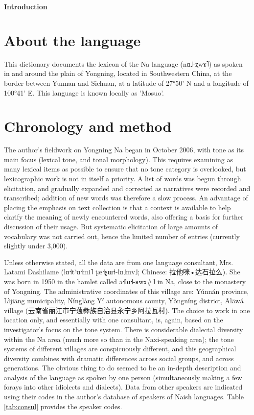 \documentclass[oldfontcommands,oneside,a4paper,11pt]{article}
\newcommand{\ipa}[1]{{\phon #1}} %
\newcommand{\zh}[1]{{\cn #1}}
\begin{document}
 
	
	{\LARGE \textbf{Introduction}}
	\section{About the language} \label{sec:language}
	
	This dictionary documents the lexicon of the Na language (\ipa{nɑ˩-ʐwɤ˥}) as spoken in and around the plain of Yongning, located in Southwestern China, at the border between Yunnan and Sichuan, at a latitude of 27°50’ N and a longitude of 100°41’ E. This language is known locally as 'Mosuo'. 
	
	\section{Chronology and method} \label{sec:method}
	
	The author's fieldwork on Yongning Na began in October 2006, with tone as its main focus (lexical tone, and tonal morphology). This requires examining as many lexical items as possible to ensure that no tone category is overlooked, but lexicographic work is not in itself a priority. A list of words was begun through elicitation, and gradually expanded and corrected as narratives were recorded and transcribed; addition of new words was therefore a slow process. An advantage of placing the emphasis on text collection is that a context is available to help clarify the meaning of newly encountered words, also offering a basis for further discussion of their usage. But systematic elicitation of large amounts of vocabulary was not carried out, hence the limited number of entries (currently slightly under 3,000). 
	
	Unless otherwise stated, all the data are from one language consultant, Mrs. Latami Dashilame (\ipa{lɑ˧tʰɑ˧mi˥ ʈæ˧ʂɯ˧-lɑ˩mv˩}; Chinese: \zh{ 拉他咪•达石拉么}). She was born in 1950 in the hamlet called \ipa{ə˧lɑ˧-ʁwɤ\#˥} in Na, close to the monastery of Yongning. The administrative coordinates of this village are: Yúnnán province, Lìjiāng municipality, Nínglàng Yí autonomous county, Yǒngníng district, Ālāwǎ village (\zh{云南省丽江市宁蒗彝族自治县永宁乡阿拉瓦村}). The choice to work in one location only, and essentially with one consultant, is, again, based on the investigator's focus on the tone system. There is considerable dialectal diversity within the Na area (much more so than in the Naxi-speaking area); the tone systems of different villages are conspicuously different, and this geographical diversity combines with dramatic differences across social groups, and across generations. The obvious thing to do seemed to be an in-depth description and analysis of the language as spoken by one person (simultaneously making a few forays into other idiolects and dialects). Data from other speakers are indicated using their codes in the author's database of speakers of Naish languages. Table \ref{tab:consul} provides the speaker codes.
	
\end{document}
